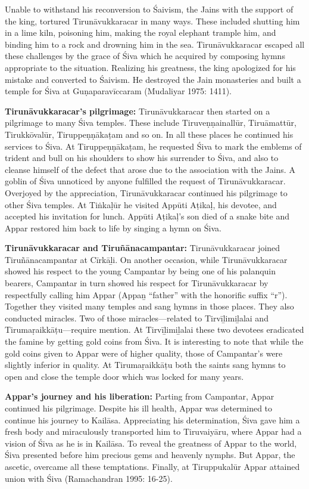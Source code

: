 Unable to withstand his reconversion to Śaivism, the Jains with the support of the king, tortured Tirunāvukkaracar in many ways. These included shutting him in a lime kiln, poisoning him, making the royal elephant trample him, and binding him to a rock and drowning him in the sea. Tirunāvukkaracar escaped all these challenges by the grace of Śiva which he acquired by composing hymns appropriate to the situation. Realizing his greatness, the king apologized for his mistake and converted to Śaivism. He destroyed the Jain monasteries and built a temple for Śiva at Guṇaparavīccaram (Mudaliyar 1975: 1411).

\textbf{Tirunāvukkaracar’s pilgrimage:} Tirunāvukkaracar then started on a pilgrimage to many Śiva temples. These include Tiruveṇṇainallūr, Tiruāmattūr, Tirukkōvalūr, Tiruppeṇṇākaṭam and so on. In all these places he continued his services to Śiva. At Tiruppeṇṇākaṭam, he requested Śiva to mark the emblems of trident and bull on his shoulders to show his surrender to Śiva, and also to cleanse himself of the defect that arose due to the association with the Jains. A goblin of Śiva unnoticed by anyone fulfilled the request of Tirunāvukkaracar. Overjoyed by the appreciation, Tirunāvukkaracar continued his pilgrimage to other Śiva temples. At Tiṅkaḷūr he visited Appūti Aṭikaḷ, his devotee, and accepted his invitation for lunch. Appūti Aṭikaḷ’s son died of a snake bite and Appar restored him back to life by singing a hymn on Śiva.

\textbf{Tirunāvukkaracar and Tiruñānacampantar:} Tirunāvukkaracar joined Tiruñānacampantar at Cīrkāḻi. On another occasion, while Tirunāvukkaracar showed his respect to the young Campantar by being one of his palanquin bearers, Campantar in turn showed his respect for Tirunāvukkaracar by respectfully calling him Appar (Appaṉ “father” with the honorific suffix “r”). Together they visited many temples and sang hymns in those places. They also conducted miracles. Two of those miracles—related to Tirvīḻimiḻalai and Tirumaṛaikkāṭu—require mention. At Tirvīḻimiḻalai these two devotees eradicated the famine by getting gold coins from Śiva. It is interesting to note that while the gold coins given to Appar were of higher quality, those of Campantar’s were slightly inferior in quality. At Tirumaṛaikkāṭu both the saints sang hymns to open and close the temple door which was locked for many years.

\textbf{Appar’s journey and his liberation:} Parting from Campantar, Appar continued his pilgrimage. Despite his ill health, Appar was determined to continue his journey to Kailāsa. Appreciating his determination, Śiva gave him a fresh body and miraculously transported him to Tiruvaiyāru, where Appar had a vision of Śiva as he is in Kailāsa. To reveal the greatness of Appar to the world, Śiva presented before him precious gems and heavenly nymphs. But Appar, the ascetic, overcame all these temptations. Finally, at Tiruppukalūr Appar attained union with Śiva (Ramachandran 1995: 16-25).


